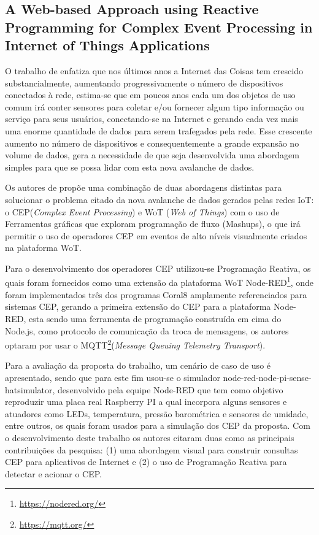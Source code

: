 \documentclass[ti,table]{texufpel} %
\begin{document}
     

  

  

  

\subsection{A Web-based Approach using Reactive Programming for Complex Event Processing in Internet of Things Applications}     

     

    O trabalho de \cite{art2zimmerle2018web} enfatiza que nos últimos anos a Internet das Coisas tem crescido substancialmente, aumentando progressivamente o número de dispositivos conectados à rede, estima-se que em poucos anos cada um dos objetos de uso comum irá conter sensores para coletar e/ou fornecer algum tipo informação ou serviço para seus usuários, conectando-se na Internet e gerando cada vez mais uma enorme quantidade de dados para serem trafegados pela rede. Esse crescente aumento no número de dispositivos e consequentemente a grande expansão no volume de dados, gera a necessidade de que seja desenvolvida uma abordagem simples para que se possa lidar com esta nova avalanche de dados. 

     

    Os autores de \cite{art2zimmerle2018web} propõe uma combinação de duas abordagens distintas para solucionar o problema citado da nova avalanche de dados gerados pelas redes IoT: o CEP(\textit{Complex Event Processing}) e WoT (\textit{Web of Things}) com o uso de Ferramentas gráficas que exploram programação de fluxo (Mashups), o que irá permitir o uso de operadores CEP em eventos de alto níveis visualmente criados na plataforma WoT. 

    Para o desenvolvimento dos operadores CEP utilizou-se Programação Reativa, os quais foram fornecidos como uma extensão da plataforma WoT Node-RED\footnote{\url{https://nodered.org/}}, onde foram implementados três dos programas Coral8 amplamente referenciados para sistemas CEP, gerando a primeira extensão do CEP para a plataforma Node-RED, esta sendo uma ferramenta de programação construída em cima do Node.js, como protocolo de comunicação da troca de mensagens, os autores optaram por usar o MQTT\footnote{\url{https://mqtt.org/}}(\textit{Message Queuing Telemetry Transport}).      

     

    Para a avaliação da proposta do trabalho, um cenário de caso de uso é apresentado, sendo que para este fim usou-se o simulador node-red-node-pi-sense-hatsimulator, desenvolvido pela equipe Node-RED que tem como objetivo reproduzir uma placa real Raspberry PI a qual incorpora alguns sensores e atuadores como LEDs, temperatura, pressão barométrica e sensores de umidade, entre outros, os quais foram usados para a simulação dos CEP da proposta. Com o desenvolvimento deste trabalho os autores citaram duas como as principais contribuições da pesquisa: (1) uma abordagem visual para construir consultas CEP para aplicativos de Internet e (2) o uso de Programação Reativa para detectar e acionar o CEP. 
\end{document}
